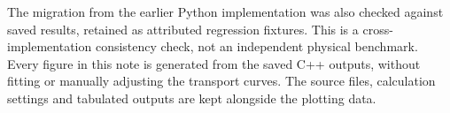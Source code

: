 The migration from the earlier Python implementation was also checked against
saved results, retained as attributed regression fixtures. This is a
cross-implementation consistency check, not an independent physical benchmark.
Every figure in this note
is generated from the saved C++ outputs, without fitting or manually adjusting
the transport curves. The source files, calculation settings and tabulated
outputs are kept alongside the plotting data.
